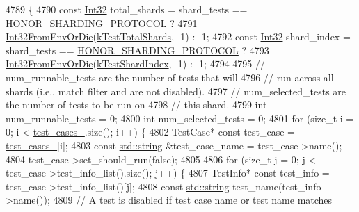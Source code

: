 \begin{DoxyCode}
4789                                                             \{
4790   \textcolor{keyword}{const} \hyperlink{namespacetesting_1_1internal_a8ee38faaf875f133358abaf9bc056cec}{Int32} total\_shards = shard\_tests == \hyperlink{classtesting_1_1internal_1_1UnitTestImpl_acc5ffd3f9bc2e87bb3dba4218f58af43abec11f1c4bb8a3e2b99fa8328bccd58c}{HONOR\_SHARDING\_PROTOCOL} ?
4791       \hyperlink{namespacetesting_1_1internal_aaa576613655c2f380278c255c3ec5fef}{Int32FromEnvOrDie}(\hyperlink{namespacetesting_a7542311baba200ebabd4065717606f6e}{kTestTotalShards}, -1) : -1;
4792   \textcolor{keyword}{const} \hyperlink{namespacetesting_1_1internal_a8ee38faaf875f133358abaf9bc056cec}{Int32} shard\_index = shard\_tests == \hyperlink{classtesting_1_1internal_1_1UnitTestImpl_acc5ffd3f9bc2e87bb3dba4218f58af43abec11f1c4bb8a3e2b99fa8328bccd58c}{HONOR\_SHARDING\_PROTOCOL} ?
4793       \hyperlink{namespacetesting_1_1internal_aaa576613655c2f380278c255c3ec5fef}{Int32FromEnvOrDie}(\hyperlink{namespacetesting_a5f76dfdb8cb2664da54e320ecaba3643}{kTestShardIndex}, -1) : -1;
4794 
4795   \textcolor{comment}{// num\_runnable\_tests are the number of tests that will}
4796   \textcolor{comment}{// run across all shards (i.e., match filter and are not disabled).}
4797   \textcolor{comment}{// num\_selected\_tests are the number of tests to be run on}
4798   \textcolor{comment}{// this shard.}
4799   \textcolor{keywordtype}{int} num\_runnable\_tests = 0;
4800   \textcolor{keywordtype}{int} num\_selected\_tests = 0;
4801   \textcolor{keywordflow}{for} (\textcolor{keywordtype}{size\_t} i = 0; i < \hyperlink{classtesting_1_1internal_1_1UnitTestImpl_a79ec0f733ada2898efd1a7fbd8587fb3}{test\_cases\_}.size(); i++) \{
4802     TestCase* \textcolor{keyword}{const} test\_case = \hyperlink{classtesting_1_1internal_1_1UnitTestImpl_a79ec0f733ada2898efd1a7fbd8587fb3}{test\_cases\_}[i];
4803     \textcolor{keyword}{const} \hyperlink{namespacetesting_1_1internal_a8e8ff5b11e64078831112677156cb111}{std::string} &test\_case\_name = test\_case->name();
4804     test\_case->set\_should\_run(\textcolor{keyword}{false});
4805 
4806     \textcolor{keywordflow}{for} (\textcolor{keywordtype}{size\_t} j = 0; j < test\_case->test\_info\_list().size(); j++) \{
4807       TestInfo* \textcolor{keyword}{const} test\_info = test\_case->test\_info\_list()[j];
4808       \textcolor{keyword}{const} \hyperlink{namespacetesting_1_1internal_a8e8ff5b11e64078831112677156cb111}{std::string} test\_name(test\_info->name());
4809       \textcolor{comment}{// A test is disabled if test case name or test name matches}

\end{DoxyCode}
